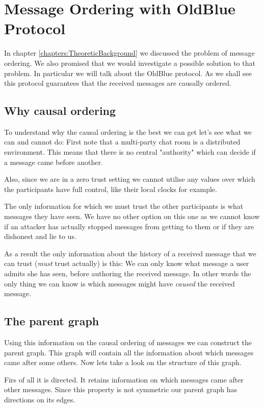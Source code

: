 \section{Message Ordering with OldBlue Protocol}
\label{sections:ordering_with_oldblue}

In chapter \ref{chapters:TheoreticBackground} we discussed the problem of message ordering.
We also promised that we would investigate a possible solution to that problem.
In particular we will talk about the OldBlue protocol.
As we shall see this protocol guarantees that the received messages are causally ordered.

\subsection{Why causal ordering}

To understand why the causal ordering is the best we can get let's see what we can and cannot do:
First note that a multi-party chat room is a distributed environment.
This means that there is no central "authority" which can decide if a message came before another.

Also, since we are in a zero trust setting we cannot utilise any values over which the participants have full control, like their local clocks for example.

The only information for which we must trust the other participants is what messages they have seen.
We have no other option on this one as we cannot know if an attacker has actually stopped messages from getting to them or if they are dishonest and lie to us.

As a result the only information about the history of a received message that we can trust (\emph{must} trust actually) is this:
We can only know what message a user admits she has seen, before authoring the received message.
In other words the only thing we can know is which messages might have \emph{caused} the received message.

\subsection{The parent graph}

Using this information on the causal ordering of messages we can construct the parent graph.
This graph will contain all the information about which messages came after some others.
Now lets take a look on the structure of this graph.

Firs of all it is directed.
It retains information on which messages came after other messages.
Since this property is not symmetric our parent graph has directions on its edges.


